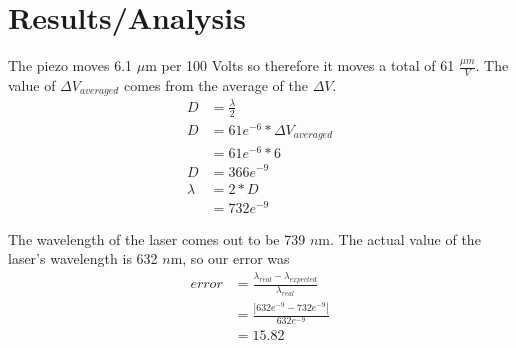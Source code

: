 \section{Results/Analysis}

	The piezo moves 6.1 $\mu$m per 100 Volts so therefore it moves a total of 61 $\frac{\mu m}{V}$.
	The value of $\Delta V_{averaged}$ comes from the average of the $\Delta V$.
\begin{align*}
	D &= \frac{\lambda}{2} \\
	D &= 61e^{-6} * \Delta V_{averaged} \\
	  &= 61e^{-6} * 6 \\
	D &= 366e^{-9} \\
	\lambda &= 2*D \\
	 &= 732e^{-9}	
\end{align*}

The wavelength of the laser comes out to be 739 $n$m. The actual value of the laser's wavelength is 632 $n$m, so our error was 
	\begin{align*}
		error &=\frac{\lambda_{real}-\lambda_{expected}}{\lambda_{real}} \\
			&= \frac{|632e^{-9}-732e^{-9}|}{632e^{-9}}	\\	
			&= 15.82
	\end{align*}
